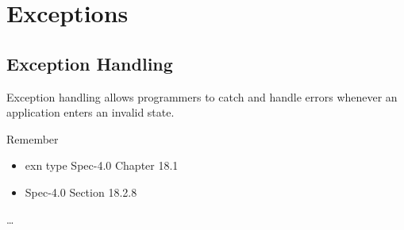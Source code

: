 \chapter{Exceptions}
\label{chap:exceptions}
\section{Exception Handling}
Exception handling allows programmers to catch and handle errors whenever an application enters an invalid state.

Remember
\begin{itemize}
\item exn type Spec-4.0 Chapter 18.1
\item Spec-4.0 Section 18.2.8
\end{itemize}
\dots 

